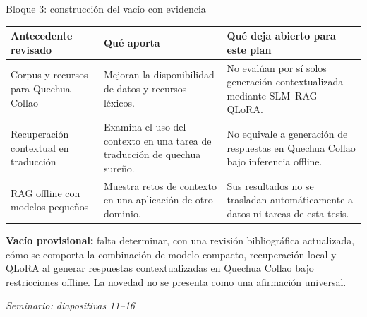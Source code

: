 \documentclass[aspectratio=169,10pt,spanish]{beamer}
\newcommand{\fuente}[1]{\vspace{0.05cm}\hfill{\color{bpNavy!65}\tiny\textit{Seminario: diapositivas #1}}}
\begin{document}
\begin{frame}{Bloque 3: construcción del vacío con evidencia}
    \vspace{-0.12cm}
    \begin{center}
    \scriptsize
    \begin{tabularx}{\textwidth}{>{\raggedright\arraybackslash}p{2.55cm} X X}
        \toprule
        \textbf{\color{bpNavy}Antecedente revisado} &
        \textbf{\color{bpNavy}Qué aporta} &
        \textbf{\color{bpNavy}Qué deja abierto para este plan}\\
        \midrule
        Corpus y recursos para Quechua Collao &
        Mejoran la disponibilidad de datos y recursos léxicos. &
        No evalúan por sí solos generación contextualizada mediante SLM--RAG--QLoRA.\\
        \addlinespace[1.5mm]
        Recuperación contextual en traducción &
        Examina el uso del contexto en una tarea de traducción de quechua sureño. &
        No equivale a generación de respuestas en Quechua Collao bajo inferencia offline.\\
        \addlinespace[1.5mm]
        RAG offline con modelos pequeños &
        Muestra retos de contexto en una aplicación de otro dominio. &
        Sus resultados no se trasladan automáticamente a datos ni tareas de esta tesis.\\
        \bottomrule
    \end{tabularx}
    \end{center}
    \vspace{0.08cm}
    \begin{tcolorbox}[colback=bpGold!12,colframe=bpGold!90!black,arc=1.2mm]
        \scriptsize
        \textbf{Vacío provisional:} falta determinar, con una revisión bibliográfica actualizada,
        cómo se comporta la combinación de modelo compacto, recuperación local y QLoRA al generar
        respuestas contextualizadas en Quechua Collao bajo restricciones offline.
        La novedad no se presenta como una afirmación universal.
    \end{tcolorbox}
    \fuente{11--16}
\end{frame}
\end{document}

